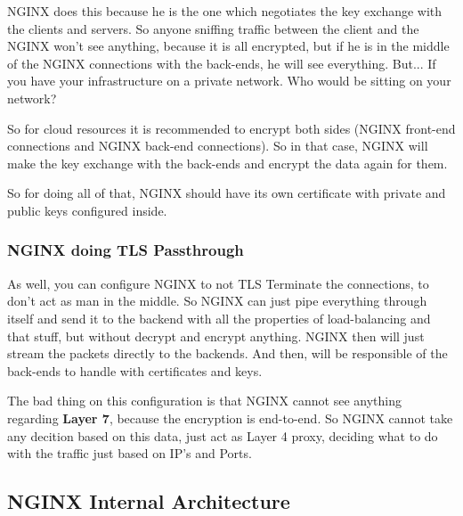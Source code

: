 \documentclass{article}
\begin{document}
NGINX does this because he is the one which negotiates the key exchange with the clients and servers. So anyone sniffing traffic between the client and the NGINX won't see anything, because it is all encrypted, but if he is in the middle of the NGINX connections with the back-ends, he will see everything. But... If you have your infrastructure on a private network. Who would be sitting on your network? 

So for cloud resources it is recommended to encrypt both sides (NGINX front-end connections and NGINX back-end connections). So in that case, NGINX will make the key exchange with the back-ends and encrypt the data again for them.

So for doing all of that, NGINX should have its own certificate with private and public keys configured inside.

\subsubsection{NGINX doing TLS Passthrough}
As well, you can configure NGINX to not TLS Terminate the connections, to don't act as man in the middle. So NGINX can just pipe everything through itself and send it to the backend with all the properties of load-balancing and that stuff, but without decrypt and encrypt anything. NGINX then will just stream the packets directly to the backends. And then, will be responsible of the back-ends to handle with certificates and keys.

The bad thing on this configuration is that NGINX cannot see anything regarding \textbf{Layer 7}, because the encryption is end-to-end. So NGINX cannot take any decition based on this data, just act as Layer 4 proxy, deciding what to do with the traffic just based on IP's and Ports.

\subsection{NGINX Internal Architecture}
\end{document}
